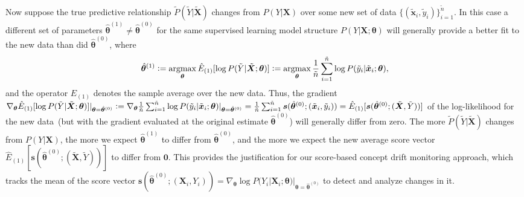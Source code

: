 \documentclass[twoside,11pt]{article}
\DeclareMathOperator*{\argmax}{argmax} %
\begin{document}
Now suppose the true predictive relationship $\tilde{P}(\tilde{Y}|\tilde{\bm{X}})$ changes from $P(Y|\bm{X})$ over some new set of data $\{(\tilde{\bm{x}}_i, \tilde{y}_i)\}_{i=1}^{\tilde{n}}$. In this case a different set of parameters $\hat{\bm{\theta}}^{(1)} \neq \hat{\bm{\theta}}^{(0)}$ for the same supervised learning model structure $P(Y|\bm{X};\bm{\theta})$ will generally provide a better fit to the new data than did $\hat{\bm{\theta}}^{(0)}$, where 
\begin{align}
\begin{aligned}
\hat{\bm{\theta}}^{(1)} \vcentcolon= \argmax_{\bm{\theta}}\hat{E}_{(1)}[\log{P(\tilde{Y}|\tilde{\bm{X}}; \bm{\theta})}] \vcentcolon= \argmax_{\bm{\theta}}\frac{1}{\tilde{n}}\sum_{i=1}^{\tilde{n}} \log{P(\tilde{y}_i|\tilde{\bm{x}}_i;\bm{\theta})},
\end{aligned}
\label{eqn:score_exp_nonzero_emp}
\end{align}   
and the operator $\hat{E}_{(1)}$ denotes the sample average over the new data. Thus, the gradient $\nabla_{\bm{\theta}}\hat{E}_{(1)}[\log{P(\tilde{Y} | \tilde{\bm{X}}; {\bm{\theta}})}]|_{\bm{\theta}=\hat{\bm{\theta}}^{(0)}} \vcentcolon= \nabla_{\bm{\theta}}\frac{1}{\tilde{n}}\sum_{i=1}^{\tilde{n}} \log{P(\tilde{y}_i | \tilde{\bm{x}}_i; {\bm{\theta}})}|_{\bm{\theta}=\hat{\bm{\theta}}^{(0)}} = \frac{1}{\tilde{n}} \sum_{i=1}^{\tilde{n}} \bm{s}(\hat{\bm{\theta}}^{(0)};(\tilde{\bm{x}}_i, \tilde{y}_i)) = \hat{E}_{(1)}[\bm{s}(\hat{\bm{\theta}}^{(0)};(\tilde{\bm{X}}, \tilde{Y}))]$ of the log-likelihood for the new data~(but with the gradient evaluated at the original estimate $\hat{\bm{\theta}}^{(0)}$) will generally differ from zero. The more $\tilde{P}(\tilde{Y}|\tilde{\bm{X}})$ changes from $P(Y|\bm{X})$, the more we expect $\hat{\bm{\theta}}^{(1)}$ to differ from $\hat{\bm{\theta}}^{(0)}$, and the more we expect the new average score vector $\hat{E}_{(1)}[\bm{s}(\hat{\bm{\theta}}^{(0)};(\tilde{\bm{X}}, \tilde{Y}))]$ to differ from $\bm{0}$. This provides the justification for our score-based concept drift monitoring approach, which tracks the mean of the score vector $\bm{s}(\hat{\bm{\theta}}^{(0)};(\bm{X}_i, Y_i)) = \nabla_{\bm{\theta}}\log P(Y_i|\bm{X}_i; \bm{\theta})|_{\bm{\theta}=\hat{\bm{\theta}}^{(0)}}$ to detect and analyze changes in it. 
\end{document}
